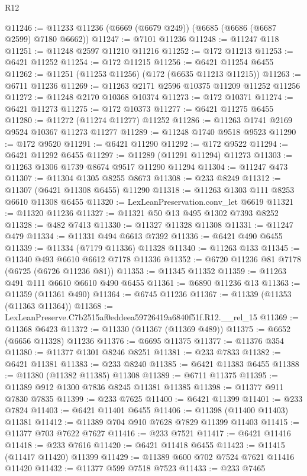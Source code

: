 \begin{lexlean}{R12}
\begin{coremodule}
@11246 := @11233 @11236 (@6669 (@6679 @249)) (@6685 (@6686 (@6687 @2599) @7180 @6662))
@11247 := @7101 @11236
@11248 := @11247 @118
@11251 := @11248 @2597 @11210 @11216
@11252 := @172 @11213
@11253 := @6421 @11252
@11254 := @172 @11215
@11256 := @6421 @11254 @6455
@11262 := @11251 (@11253 @11256) (@172 (@6635 @11213 @11215))
@11263 := @6711 @11236
@11269 := @11263 @2171 @2596 @10375 @11209 @11252 @11256
@11272 := @11248 @2170 @10368 @10374
@11273 := @172 @10371
@11274 := @6421 @11273
@11275 := @172 @10373
@11277 := @6421 @11275 @6455
@11280 := @11272 (@11274 @11277) @11252
@11286 := @11263 @1741 @2169 @9524 @10367 @11273 @11277
@11289 := @11248 @1740 @9518 @9523
@11290 := @172 @9520
@11291 := @6421 @11290
@11292 := @172 @9522
@11294 := @6421 @11292 @6455
@11297 := @11289 (@11291 @11294) @11273
@11303 := @11263 @1306 @1739 @8674 @9517 @11290 @11294
@11304 := @11247 @473
@11307 := @11304 @1305 @8255 @8673
@11308 := @233 @8249
@11312 := @11307 (@6421 @11308 @6455) @11290
@11318 := @11263 @1303 @111 @8253 @6610 @11308 @6455
@11320 := LexLeanPreservation.conv_let @6619
@11321 := @11320 @11236
@11327 := @11321 @50 @13 @495 @1302 @7393 @8252
@11328 := @482 @7413
@11330 := @11327 @11328 @11308
@11331 := @11247 @479
@11334 := @11331 @494 @6613 @7392
@11336 := @6421 @490 @6455
@11339 := @11334 (@7179 @11336) @11328
@11340 := @11263 @133
@11345 := @11340 @493 @6610 @6612 @7178 @11336
@11352 := @6720 @11236 @81 @7178 (@6725 (@6726 @11236 @81))
@11353 := @11345 @11352
@11359 := @11263 @491 @111 @6610 @6610 @490 @6455
@11361 := @6890 @11236 @13
@11363 := @11359 (@11361 @490)
@11364 := @6745 @11236
@11367 := @11339 (@11353 (@11363 @11364))
@11368 := LexLeanPreserve.C7b2515af0eddeea59726419a6840f51f.R12.__rel_15
@11369 := @11368 @6423
@11372 := @11330 (@11367 (@11369 @489))
@11375 := @6652 (@6656 @11328) @11236
@11376 := @6695 @11375
@11377 := @11376 @354
@11380 := @11377 @1301 @8246 @8251
@11381 := @233 @7833
@11382 := @6421 @11381
@11383 := @233 @8240
@11385 := @6421 @11383 @6455
@11388 := @11380 (@11382 @11385) @11308
@11389 := @6711 @11375
@11395 := @11389 @912 @1300 @7836 @8245 @11381 @11385
@11398 := @11377 @911 @7830 @7835
@11399 := @233 @7625
@11400 := @6421 @11399
@11401 := @233 @7824
@11403 := @6421 @11401 @6455
@11406 := @11398 (@11400 @11403) @11381
@11412 := @11389 @704 @910 @7628 @7829 @11399 @11403
@11415 := @11377 @703 @7622 @7627
@11416 := @233 @7521
@11417 := @6421 @11416
@11418 := @233 @7616
@11420 := @6421 @11418 @6455
@11423 := @11415 (@11417 @11420) @11399
@11429 := @11389 @600 @702 @7524 @7621 @11416 @11420
@11432 := @11377 @599 @7518 @7523
@11433 := @233 @7465

\end{coremodule}
\end{lexlean}
